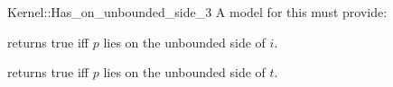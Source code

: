 \begin{ccRefFunctionObjectConcept}{Kernel::Has_on_unbounded_side_3}
A model for this must provide:


{returns true iff $p$ lies on the unbounded side of $i$.}

{returns true iff $p$ lies on the unbounded side of $t$.}

\end{ccRefFunctionObjectConcept}
